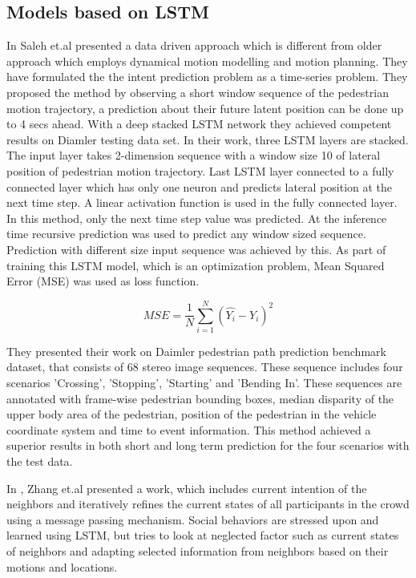 \subsection{Models based on LSTM }
In \cite{saleh2017intent} Saleh et.al presented a data driven approach which is different from older approach which employs dynamical motion modelling and motion planning. They have formulated the the intent prediction problem as a time-series problem. They proposed the method by observing a short window sequence of the pedestrian motion trajectory, a prediction about their future latent position can be done up to 4 secs ahead. With a deep stacked LSTM network they achieved competent results on Diamler testing data set. In their work, three LSTM layers are stacked. The input layer takes 2-dimension sequence with a window size 10 of lateral position of pedestrian motion trajectory. Last LSTM layer connected to a fully connected layer which has only one neuron and predicts lateral position at the next time step. A linear activation function is used in the fully connected layer. In this method, only the next time step value was predicted. At the inference time recursive prediction was used to predict any window sized sequence. Prediction with different size input sequence was achieved by this.
As part of training this LSTM  model, which is an optimization problem, Mean Squared Error (MSE) was used as loss function.

\begin{equation}
MSE= \frac{1}{N}\sum_{i=1}^{N}(\hat{Y_i} - Y_i)^2
\end{equation}

They presented their work on Daimler pedestrian path prediction benchmark dataset, that consists of 68 stereo image sequences. These sequence includes four scenarios 'Crossing', 'Stopping', 'Starting' and 'Bending In'. These sequences are annotated with frame-wise pedestrian bounding boxes, median disparity of the upper body area of the pedestrian, position of the pedestrian in the vehicle coordinate system and time to event information. This method achieved a superior results in both short and long term prediction for the four scenarios with the test data.

In \cite{zhang2019sr}, Zhang et.al presented a work, which includes current intention of the neighbors and iteratively refines the current states of all participants in the crowd using a message passing mechanism. Social behaviors are stressed upon and learned using LSTM, but \cite{zhang2019sr} tries to look at neglected factor such as current states of neighbors and adapting selected information from neighbors based on their motions and locations. 


